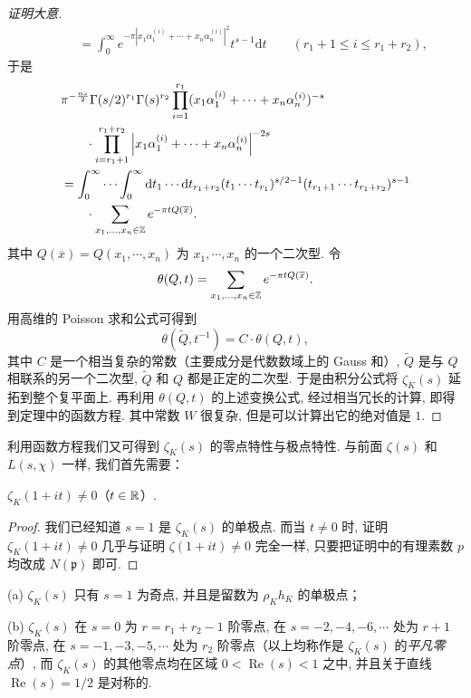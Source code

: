 \begin{proof}[证明大意]
\begin{align*}
  &\qquad=\int_0^{\infty}e^{-\pi|x_1\alpha_1^{(i)}+\cdots+x_n\alpha_n^{(i)}|^2}t^{s-1}\mathrm{d}t\qquad(r_1+1\leqslant i\leqslant r_1+r_2),
\end{align*}
于是
\begin{align*}
  &\pi^{-\frac{ns}{2}}\Gamma(s/2)^{r_1}\Gamma(s)^{r_2}\prod_{i=1}^{r_1}(x_1\alpha_1^{(i)}+\cdots+x_n\alpha_n^{(i)})^{-s}\\
  &\qquad\cdot\prod_{i=r_1+1}^{r_1+r_2}\left|x_1\alpha_1^{(i)}+\cdots+x_n\alpha_n^{(i)}\right|^{-2s}\\
  &=\int_0^{\infty}\cdots\int_0^{\infty}\mathrm{d}t_1\cdots\mathrm{d}t_{r_1+r_2}(t_1\cdots t_{r_1})^{s/2-1}(t_{r_1+1}\cdots t_{r_1+r_2})^{s-1}\\
  &\qquad\cdot\sum_{x_1,\dots,x_n\in\mathbb{Z}}e^{-\pi tQ(\overline{x})}.
\end{align*}
其中 $Q(\overline{x})=Q(x_1,\cdots,x_n)$ 为 $x_1,\cdots,x_n$ 的一个二次型. 令
\[
  \theta(Q,t)=\sum_{x_1,\dots,x_n\in\mathbb{Z}}e^{-\pi tQ(\overline{x})}.
\]
用高维的 Poisson 求和公式可得到
\[
  \theta(\widetilde{Q},t^{-1})=C\cdot\theta(Q,t),
\]
其中 $C$ 是一个相当复杂的常数（主要成分是代数数域上的 Gauss 和）, $\widetilde{Q}$ 是与 $Q$ 相联系的另一个二次型, $\widetilde{Q}$ 和 $Q$ 都是正定的二次型. 于是由积分公式将 $\zeta_K(s)$ 延拓到整个复平面上. 再利用 $\theta(Q,t)$ 的上述变换公式, 经过相当冗长的计算, 即得到定理中的函数方程. 其中常数 $W$ 很复杂, 但是可以计算出它的绝对值是 $1$. 
\end{proof}

利用函数方程我们又可得到 $\zeta_K(s)$ 的零点特性与极点特性. 与前面 $\zeta(s)$ 和 $L(s,\chi)$ 一样, 我们首先需要：

\begin{lemma}\label{lem:ch4-10}
$\zeta_K(1+it)\neq 0$（$t\in\mathbb{R}$）. 
\end{lemma}

\begin{proof}
我们已经知道 $s=1$ 是 $\zeta_K(s)$ 的单极点. 而当 $t\neq 0$ 时, 证明 $\zeta_K(1+it)\neq 0$ 几乎与证明 $\zeta(1+it)\neq 0$ 完全一样, 只要把证明中的有理素数 $p$ 均改成 $N(\mathfrak{p})$ 即可. 
\end{proof}

\begin{lemma}\label{lem:ch4-11}
(a) $\zeta_K(s)$ 只有 $s=1$ 为奇点, 并且是留数为 $\rho_Kh_K$ 的单极点；

(b) $\zeta_K(s)$ 在 $s=0$ 为 $r=r_1+r_2-1$ 阶零点, 在 $s=-2,-4,-6,\cdots$ 处为 $r+1$ 阶零点, 在 $s=-1,-3,-5,\cdots$ 处为 $r_2$ 阶零点（以上均称作是 $\zeta_K(s)$ 的\emph{平凡零点}）, 而 $\zeta_K(s)$ 的其他零点均在区域 $0<\operatorname{Re}(s)<1$ 之中, 并且关于直线 $\operatorname{Re}(s)=1/2$ 是对称的. 
\end{lemma}

